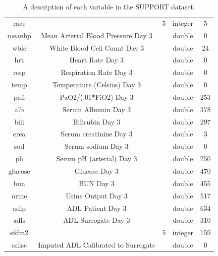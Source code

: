 \documentclass[
]{jss}
\begin{document}
\begin{table}[ht]
\begin{tabular}{ccccc}
race          &                                          & 5               & integer          & 5            \\
meanbp        & Mean Arterial Blood Pressure Day 3       &                 & double           & 0            \\
wblc          & White Blood Cell Count Day 3             &                 & double           & 24           \\
hrt           & Heart Rate Day 3                         &                 & double           & 0            \\
resp          & Respiration Rate Day 3                   &                 & double           & 0            \\
temp          & Temperature (Celsius) Day 3              &                 & double           & 0            \\
pafi          & PaO2/(.01*FiO2) Day 3                    &                 & double           & 253          \\
alb           & Serum Albumin Day 3                      &                 & double           & 378          \\
bili          & Bilirubin Day 3                          &                 & double           & 297          \\
crea          & Serum creatinine Day 3                   &                 & double           & 3            \\
sod           & Serum sodium Day 3                       &                 & double           & 0            \\
ph            & Serum pH (arterial) Day 3                &                 & double           & 250          \\
glucose       & Glucose Day 3                            &                 & double           & 470          \\
bun           & BUN Day 3                                &                 & double           & 455          \\
urine         & Urine Output Day 3                       &                 & double           & 517          \\
adlp          & ADL Patient Day 3                        &                 & double           & 634          \\
adls          & ADL Surrogate Day 3                      &                 & double           & 310          \\
sfdm2         &                                          & 5               & integer          & 159          \\
adlsc         & Imputed ADL Calibrated to Surrogate      &                 & double           & 0           
\end{tabular}
\caption{A description of each variable in the SUPPORT dataset.}
\label{tab:support1}
\end{table}
\end{document}
